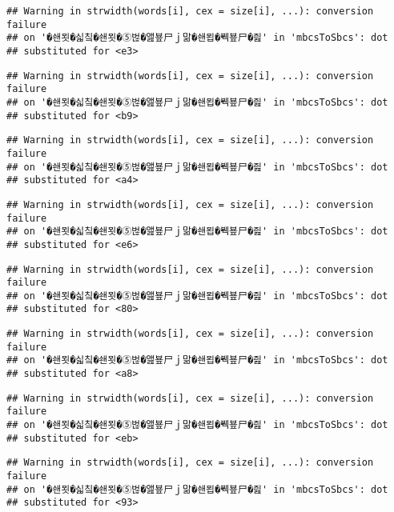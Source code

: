 \documentclass[]{article}
\begin{document}
\begin{verbatim}
## Warning in strwidth(words[i], cex = size[i], ...): conversion failure
## on '�쇈묏�싧칰�쇈묏�⑤벊�앮뵾尸ｊ맒�쇈묍�붹뵾尸�즲' in 'mbcsToSbcs': dot
## substituted for <e3>
\end{verbatim}

\begin{verbatim}
## Warning in strwidth(words[i], cex = size[i], ...): conversion failure
## on '�쇈묏�싧칰�쇈묏�⑤벊�앮뵾尸ｊ맒�쇈묍�붹뵾尸�즲' in 'mbcsToSbcs': dot
## substituted for <b9>
\end{verbatim}

\begin{verbatim}
## Warning in strwidth(words[i], cex = size[i], ...): conversion failure
## on '�쇈묏�싧칰�쇈묏�⑤벊�앮뵾尸ｊ맒�쇈묍�붹뵾尸�즲' in 'mbcsToSbcs': dot
## substituted for <a4>
\end{verbatim}

\begin{verbatim}
## Warning in strwidth(words[i], cex = size[i], ...): conversion failure
## on '�쇈묏�싧칰�쇈묏�⑤벊�앮뵾尸ｊ맒�쇈묍�붹뵾尸�즲' in 'mbcsToSbcs': dot
## substituted for <e6>
\end{verbatim}

\begin{verbatim}
## Warning in strwidth(words[i], cex = size[i], ...): conversion failure
## on '�쇈묏�싧칰�쇈묏�⑤벊�앮뵾尸ｊ맒�쇈묍�붹뵾尸�즲' in 'mbcsToSbcs': dot
## substituted for <80>
\end{verbatim}

\begin{verbatim}
## Warning in strwidth(words[i], cex = size[i], ...): conversion failure
## on '�쇈묏�싧칰�쇈묏�⑤벊�앮뵾尸ｊ맒�쇈묍�붹뵾尸�즲' in 'mbcsToSbcs': dot
## substituted for <a8>
\end{verbatim}

\begin{verbatim}
## Warning in strwidth(words[i], cex = size[i], ...): conversion failure
## on '�쇈묏�싧칰�쇈묏�⑤벊�앮뵾尸ｊ맒�쇈묍�붹뵾尸�즲' in 'mbcsToSbcs': dot
## substituted for <eb>
\end{verbatim}

\begin{verbatim}
## Warning in strwidth(words[i], cex = size[i], ...): conversion failure
## on '�쇈묏�싧칰�쇈묏�⑤벊�앮뵾尸ｊ맒�쇈묍�붹뵾尸�즲' in 'mbcsToSbcs': dot
## substituted for <93>
\end{verbatim}
\end{document}
